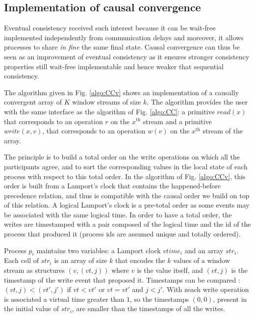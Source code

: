\documentclass[9pt,numbers]{sigplanconf}
\begin{document}
\subsection{Implementation of causal convergence}

Eventual consistency received such interest because it can be wait-free implemented independently 
from communication delays and moreover, it allows processes to share \textit{in fine} the same final state. 
Causal convergence can thus be seen as an improvement of eventual consistency as it ensures 
stronger consistency properties still wait-free implementable and hence weaker that sequential consistency.

The algorithm given in Fig. \ref{algo:CCv} shows an implementation of a causally convergent array of $K$ 
window streams of size $k$. The algorithm provides the user with the same interface as the algorithm of Fig.  \ref{algo:CC}:
a primitive $read(x)$ that corresponds to an operation $r$ on the $x^{\text{th}}$ stream and
a primitive $write(x, v)$, that corresponds to an operation $w(v)$ on the $x^{\text{th}}$ stream of the array.

The principle is to build a total order on the write operations on which all the participants agree, 
and to sort the corresponding values in the local state of each process with respect to this total order. 
In the algorithm of Fig. \ref{algo:CCv}, this order is built from a Lamport's clock \cite{lamport1978time} that contains 
the happened-before precedence relation, and thus is compatible with the causal order we build on top of this relation. 
A logical Lamport's clock is a pre-total order as some events may be associated with the same logical time. 
In order to have a total order, the writes are timestamped with a pair composed of the logical time and the 
id of the process that produced it (process ids are assumed unique and totally ordered). 

Process $p_i$ maintains two variables: a Lamport clock $vtime_i$ and an array $str_i$. 
Each cell of $str_i$ is an array of size $k$ that encodes the $k$ values of a window stream as
structures $(v, (vt, j))$ where $v$ is the value itself, and $(vt, j)$ is the timestamp of the 
write event that proposed it. Timestamps can be compared : $(vt, j) < (vt', j')$ if $vt < vt'$
or $vt = vt'$ and $j < j'$. With zeach write operation is associated a virtual time greater than $1$, so the 
timestamps $(0,0)$, present in the initial value of $str_i$, are smaller than the timestamps 
of all the writes. 
\end{document}
